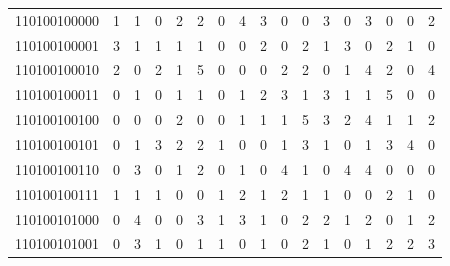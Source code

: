 \documentclass[10pt,a4paper]{article}
\begin{document}
\begin{longtable}{ |c|c|c|c|c|c|c|c|c|c|c|c|c|c|c|c|c| }
    110100100000              & 1                            & 1                                & 0                            & 2                              & 2   & 0   & 4   & 3   & 0   & 0   & 3   & 0   & 3   & 0   & 0   & 2   \\
    110100100001              & 3                            & 1                                & 1                            & 1                              & 1   & 0   & 0   & 2   & 0   & 2   & 1   & 3   & 0   & 2   & 1   & 0   \\
    110100100010              & 2                            & 0                                & 2                            & 1                              & 5   & 0   & 0   & 0   & 2   & 2   & 0   & 1   & 4   & 2   & 0   & 4   \\
    110100100011              & 0                            & 1                                & 0                            & 1                              & 1   & 0   & 1   & 2   & 3   & 1   & 3   & 1   & 1   & 5   & 0   & 0   \\
    110100100100              & 0                            & 0                                & 0                            & 2                              & 0   & 0   & 1   & 1   & 1   & 5   & 3   & 2   & 4   & 1   & 1   & 2   \\
    110100100101              & 0                            & 1                                & 3                            & 2                              & 2   & 1   & 0   & 0   & 1   & 3   & 1   & 0   & 1   & 3   & 4   & 0   \\
    110100100110              & 0                            & 3                                & 0                            & 1                              & 2   & 0   & 1   & 0   & 4   & 1   & 0   & 4   & 4   & 0   & 0   & 0   \\
    110100100111              & 1                            & 1                                & 1                            & 0                              & 0   & 1   & 2   & 1   & 2   & 1   & 1   & 0   & 0   & 2   & 1   & 0   \\
    110100101000              & 0                            & 4                                & 0                            & 0                              & 3   & 1   & 3   & 1   & 0   & 2   & 2   & 1   & 2   & 0   & 1   & 2   \\
    110100101001              & 0                            & 3                                & 1                            & 0                              & 1   & 1   & 0   & 1   & 0   & 2   & 1   & 0   & 1   & 2   & 2   & 3   \\

\end{longtable}
\end{document}
